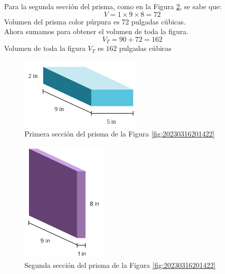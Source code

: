 \begin{solutionbox}{16cm}
\begin{minipage}[t]{.55\textwidth}
        Para la segunda sección del prisma, como en la Figura \ref{fig:20230316205119}, se sabe que:\\
        \[ V = 1\times 9\times 8=72\]
        Volumen del prisma color púrpura es 72 pulgadas cúbicas.\\
        Ahora sumamos para obtener el volumen de toda la figura.
        \[ V_T = 90+72= 162\]
        Volumen de toda la figura $V_T$ es $162$ pulgadas cúbicas
    \end{minipage}
    \begin{multicols}{2}
        \begin{figure}[H]
            \centering
            \includegraphics[width=0.55\linewidth]{../images/20230316202402}
            \caption{Primera sección del prisma de la Figura \ref{fig:20230316201422}}
            \label{fig:20230316202402}
        \end{figure}
        \columnbreak
        \begin{figure}[H]
            \centering
            \includegraphics[width=0.3\linewidth]{../images/20230316205119}
            \caption{Segunda sección del prisma de la Figura \ref{fig:20230316201422}}
            \label{fig:20230316205119}
        \end{figure}
    \end{multicols}
\end{solutionbox}


